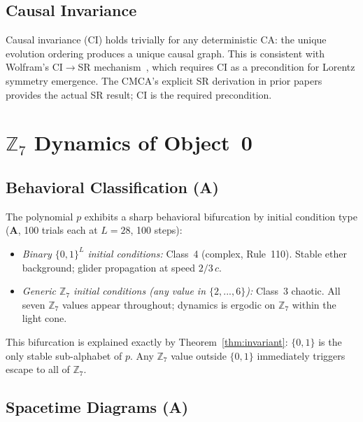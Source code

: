 \documentclass[11pt]{article}
\theoremstyle{remark}
\newcommand{\ZS}{\ensuremath{\mathbb{Z}_7}}
\newcommand{\CatA}{\textbf{A}}
\begin{document}
\FloatBarrier
\subsection{Causal Invariance}

Causal invariance (CI) holds trivially for any deterministic CA: the unique
evolution ordering produces a unique causal graph. This is consistent with
Wolfram's CI$\to$SR mechanism~\cite{Gorard2020Rel}, which requires CI as a
precondition for Lorentz symmetry emergence. The CMCA's explicit SR derivation
in prior papers~\cite{SpivackCMCA} provides the actual SR result; CI is the
required precondition.

\section{\texorpdfstring{$\mathbb{Z}_7$}{Z7} Dynamics of Object~0}
\label{sec:dynamics}

\subsection{Behavioral Classification (\CatA{})}

The polynomial $p$ exhibits a sharp behavioral bifurcation by initial condition
type (\CatA{}, 100 trials each at $L{=}28$, 100 steps):

\begin{itemize}[leftmargin=2em]
  \item \emph{Binary $\{0,1\}^L$ initial conditions:} Class~4 (complex, Rule~110).
    Stable ether background; glider propagation at speed $2/3\,c$.
  \item \emph{Generic $\ZS$ initial conditions (any value in $\{2,...,6\}$):}
    Class~3 chaotic. All seven $\ZS$ values appear throughout; dynamics is
    ergodic on $\ZS$ within the light cone.
\end{itemize}

This bifurcation is explained exactly by Theorem~\ref{thm:invariant}: $\{0,1\}$
is the only stable sub-alphabet of $p$. Any $\ZS$ value outside $\{0,1\}$
immediately triggers escape to all of $\ZS$.

\subsection{Spacetime Diagrams (\CatA{})}
\end{document}

